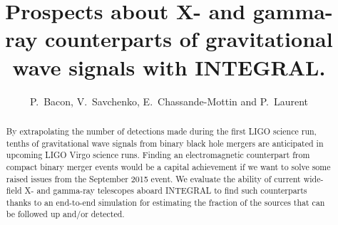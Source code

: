 \documentclass[11pt]{article}
\begin{document}
\title{Prospects about X- and gamma-ray counterparts of gravitational wave signals with INTEGRAL.}
\author{P.~Bacon, V.~Savchenko, E.~Chassande-Mottin and P.~Laurent}


\begin{abstract}
    By extrapolating the number of detections made during the first
    LIGO science run, tenths of gravitational wave signals from binary
    	black hole mergers are anticipated in upcoming LIGO Virgo science
    	runs. Finding an electromagnetic counterpart from compact binary
    	merger events would be a capital achievement if we want to solve 
    	some raised issues from the September 2015 event. We evaluate the
   	ability of current wide-field X- and gamma-ray telescopes aboard
   	INTEGRAL to find such counterparts thanks to an end-to-end simulation
   	for estimating the fraction of the sources that can be followed up and/or
   	detected. \\
\end{abstract}
\end{document}
